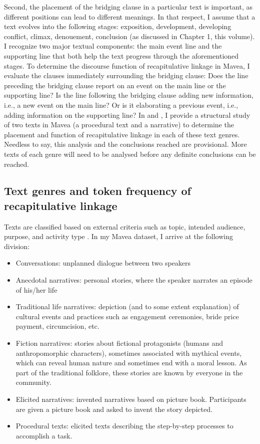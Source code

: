 \documentclass[output=paper]{LSP/langsci}
\begin{document}
Second, the placement of the bridging clause in a particular text is important, as different positions can lead to different meanings. In that respect, I assume that a text evolves into the following stages: exposition, development, developing conflict, climax, denouement, conclusion (as discussed in Chapter 1, this volume). I recognize two major textual components: the main event line and the supporting line \citep[][14--17]{longacre83} that both help the text progress through the aforementioned stages. To determine the discourse function of recapitulative linkage in Mavea, I evaluate the clauses immediately surrounding the bridging clause: Does the line preceding the bridging clause report on an event on the main line or the supporting line? Is the line following the bridging clause adding new information, i.e., a new event on the main line? Or is it elaborating a previous event, i.e., adding information on the supporting line? In  and , I provide a structural study of two texts in Mavea (a procedural text and a narrative) to determine the placement and function of recapitulative linkage in each of these text genres. Needless to say, this analysis and the conclusions reached are provisional. More texts of each genre will need to be analysed before any definite conclusions can be reached.   

\subsection{Text genres and token frequency of recapitulative linkage} 
\label{Gusec:frequency}
Texts are classified based on external criteria such as topic, intended audience, purpose, and activity type \citep[][38]{lee01}. In my Mavea dataset, I arrive at the following division: 

\begin{itemize}
\item  Conversations: unplanned dialogue between two speakers
\item Anecdotal narratives: personal stories, where the speaker narrates an episode of his/her life
\item Traditional life narratives: depiction (and to some extent explanation) of cultural events and practices such as engagement ceremonies, bride price payment, circumcision, etc.
\item Fiction narratives: stories about fictional protagonists (humans and anthropomorphic characters), sometimes associated with mythical events, which can reveal human nature and sometimes end with a moral lesson. As part of the traditional folklore, these stories are known by everyone in the community.
\item Elicited narratives: invented narratives based on picture book. Participants are given a picture book and asked to invent the story depicted.
\item Procedural texts: elicited texts describing the step-by-step processes to accomplish a task. 
\end{itemize}
\end{document}

